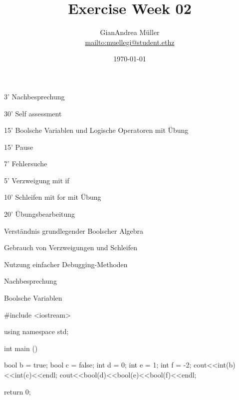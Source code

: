 \documentclass[handout,usenames,dvipsnames]{beamer}
\title{Exercise Week 02}
\author{GianAndrea Müller\\ \url{mailto:muellegi@student.ethz}}
\date{\today}
\begin{document}
\maketitle

\begin{TFTimeSchedule}
\item 3' Nachbesprechung 
\item 30' Self assessment
\item 15' Boolsche Variablen und Logische Operatoren mit Übung
\item 15' Pause
\item 7' Fehlersuche
\item 5' Verzweigung mit if
\item 10' Schleifen mit for mit Übung
\item 20' Übungsbearbeitung
\end{TFTimeSchedule}

\begin{TFLearningObjectives}
\item Verständnis grundlegender Boolscher Algebra
\item Gebrauch von Verzweigungen und Schleifen
\item Nutzung einfacher Debugging-Methoden
\end{TFLearningObjectives}

\begin{frame}{Nachbesprechung}
\end{frame}


\begin{frame}[fragile]{Boolsche Variablen}
\begin{TFCpp}
#include <iostream>

using namespace std;

int main (){

	bool b = true;
	bool c = false;
	int d = 0;
	int e = 1;
	int f = -2;	
	cout<<int(b)<<int(c)<<endl;
	cout<<bool(d)<<bool(e)<<bool(f)<<endl;

	return 0;
}
\end{TFCpp}
\end{frame}
\end{document}
